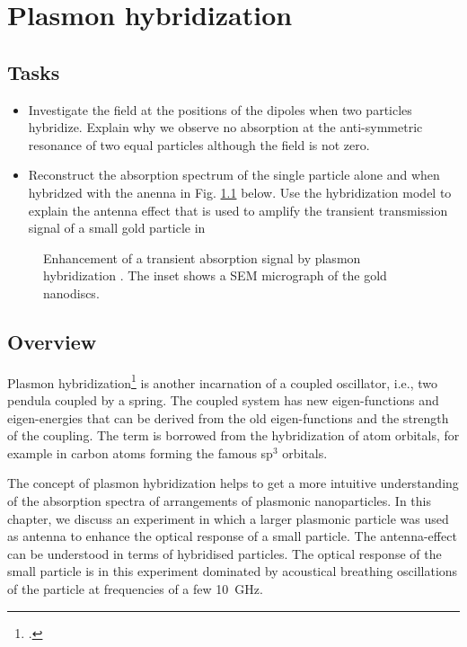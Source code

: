 \renewcommand{\lastmod}{October 29, 2021}
\renewcommand{\chapterauthors}{Markus Lippitz}


\chapter{Plasmon hybridization}
\label{chap:hybrid}

\section{Tasks}

\begin{itemize}
\item Investigate the field at the positions of the dipoles when two particles hybridize. Explain why we observe no absorption at the anti-symmetric resonance of two equal particles although the field is not zero.

\item Reconstruct the absorption spectrum of the single particle alone and when hybridzed with the anenna in Fig. \ref{fig:hybrid_schumacher11} below.
Use the hybridization model to explain the antenna effect that is used to amplify the transient transmission signal of a small gold particle in \cite{Schumacher11} 

\end{itemize}

\begin{figure}

\caption{Enhancement of a transient absorption signal by plasmon hybridization \cite{Schumacher11}. The inset shows a SEM micrograph of the gold nanodiscs.
 \label{fig:hybrid_schumacher11}}
\end{figure}


\section{Overview}

Plasmon hybridization\footcite{Prodan03} is another incarnation of a coupled oscillator, i.e., two pendula coupled by a spring. The coupled system has new eigen-functions and eigen-energies that can be derived from the old eigen-functions and the strength of the coupling. The term is borrowed from the hybridization of atom orbitals, for example in carbon atoms forming  the famous sp$^3$ orbitals.

The concept of plasmon hybridization helps to get a more intuitive understanding of the absorption spectra of arrangements of plasmonic nanoparticles. In this chapter, we discuss an experiment in which a larger plasmonic particle was used as  antenna to enhance the optical response of a small particle. The antenna-effect can be understood in terms of hybridised particles. The optical response of the small particle is in this experiment dominated by acoustical breathing oscillations of the particle at frequencies of a few 10~GHz.


